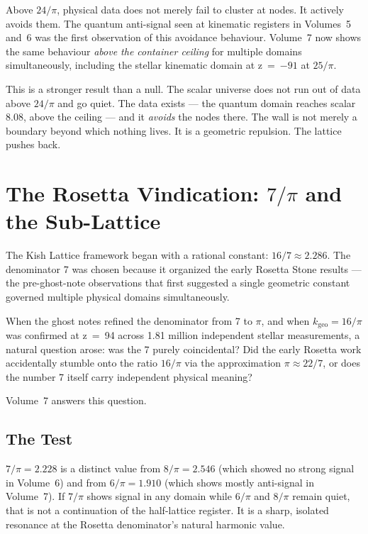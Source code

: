 \documentclass[11pt, letterpaper, openany]{book}
\begin{document}
Above $24/\pi$, physical data does not merely fail to cluster at nodes. It actively
avoids them. The quantum anti-signal seen at kinematic registers in Volumes~5 and~6
was the first observation of this avoidance behaviour. Volume~7 now shows the same
behaviour \emph{above the container ceiling} for multiple domains simultaneously,
including the stellar kinematic domain at z~=~$-91$ at $25/\pi$.

This is a stronger result than a null. The scalar universe does not run out of data
above $24/\pi$ and go quiet. The data exists --- the quantum domain reaches scalar 8.08,
above the ceiling --- and it \emph{avoids} the nodes there. The wall is not merely a
boundary beyond which nothing lives. It is a geometric repulsion. The lattice pushes
back.

\chapter{The Rosetta Vindication: $7/\pi$ and the Sub-Lattice}

The Kish Lattice framework began with a rational constant: $16/7 \approx 2.286$. The
denominator 7 was chosen because it organized the early Rosetta Stone results --- the
pre-ghost-note observations that first suggested a single geometric constant governed
multiple physical domains simultaneously.

When the ghost notes refined the denominator from 7 to $\pi$, and when $k_\text{geo} =
16/\pi$ was confirmed at z~=~94 across 1.81 million independent stellar measurements,
a natural question arose: was the 7 purely coincidental? Did the early Rosetta work
accidentally stumble onto the ratio $16/\pi$ via the approximation $\pi \approx 22/7$,
or does the number 7 itself carry independent physical meaning?

Volume~7 answers this question.

\section*{The Test}

$7/\pi = 2.228$ is a distinct value from $8/\pi = 2.546$ (which showed no strong signal
in Volume~6) and from $6/\pi = 1.910$ (which shows mostly anti-signal in Volume~7).
If $7/\pi$ shows signal in any domain while $6/\pi$ and $8/\pi$ remain quiet, that
is not a continuation of the half-lattice register. It is a sharp, isolated resonance
at the Rosetta denominator's natural harmonic value.
\end{document}
